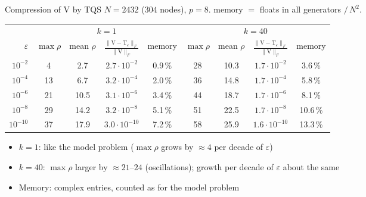 \documentclass[aspectratio=169,11pt]{beamer}
\begin{document}
\begin{frame}{Compression of $\mathrm{V}$ by TQS}
\small
$N=2432$ ($304$ nodes), $p=8$. memory $=$ floats in all generators $/\,N^2$.
\vspace{2mm}
\begin{center}
\begin{tabular}{@{}rcccccccc@{}}
\toprule
& \multicolumn{4}{c}{$k=1$} & \multicolumn{4}{c}{$k=40$} \\
\cmidrule(lr){2-5}\cmidrule(l){6-9}
$\varepsilon$ & $\max\rho$ & mean $\rho$ & $\frac{\|\mathrm{V}-\mathrm{T}_\varepsilon\|_F}{\|\mathrm{V}\|_F}$ & memory
              & $\max\rho$ & mean $\rho$ & $\frac{\|\mathrm{V}-\mathrm{T}_\varepsilon\|_F}{\|\mathrm{V}\|_F}$ & memory \\
\midrule
$10^{-2}$  & 4  & 2.7  & $2.7\cdot10^{-2}$  & 0.9\,\% & 28 & 10.3 & $1.7\cdot10^{-2}$  & 3.6\,\% \\
$10^{-4}$  & 13 & 6.7  & $3.2\cdot10^{-4}$  & 2.0\,\% & 36 & 14.8 & $1.7\cdot10^{-4}$  & 5.8\,\% \\
$10^{-6}$  & 21 & 10.5 & $3.1\cdot10^{-6}$  & 3.4\,\% & 44 & 18.7 & $1.7\cdot10^{-6}$  & 8.1\,\% \\
$10^{-8}$  & 29 & 14.2 & $3.2\cdot10^{-8}$  & 5.1\,\% & 51 & 22.5 & $1.7\cdot10^{-8}$  & 10.6\,\% \\
$10^{-10}$ & 37 & 17.9 & $3.0\cdot10^{-10}$ & 7.2\,\% & 58 & 25.9 & $1.6\cdot10^{-10}$ & 13.3\,\% \\
\bottomrule
\end{tabular}
\end{center}
\begin{itemize}
\item $k=1$: like the model problem ($\max\rho$ grows by $\approx4$ per decade of $\varepsilon$)
\item $k=40$: $\max\rho$ larger by $\approx21$--$24$ (oscillations); growth per decade of $\varepsilon$ about the same
\item Memory: complex entries, counted as for the model problem
\end{itemize}
\end{frame}
\end{document}
